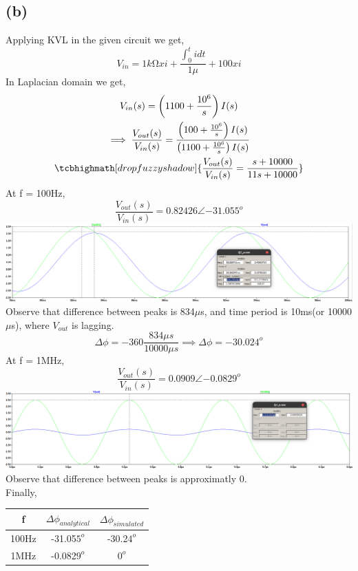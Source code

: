 \documentclass{article}
\begin{document}
\subsection*{(b)}
Applying KVL in the given circuit we get,
\begin{equation*}
V_{in} = 1k{\si{\ohm}}xi + \frac{\int_0^t{i dt}}{1\mu} + 100xi
\end{equation*}
In Laplacian domain we get,
\begin{gather*}
V_{in}(s) = \left(1100 + \frac{10^6}{s}\right)I(s)\\
\implies \frac{V_{out}(s)}{V_{in}(s)} = \frac{\left(100 + \frac{10^6}{s}\right)I(s)}{\left(1100 + \frac{10^6}{s}\right)I(s)}\\
\tcbhighmath[drop fuzzy shadow]{\frac{V_{out}(s)}{V_{in}(s)} = \frac{s + 10000}{11s + 10000}}
\end{gather*}
At f = 100Hz,\\
\begin{equation*}
\frac{V_{out}(s)}{V_{in}(s)} = 0.82426\angle{-31.055^o}
\end{equation*}
\includegraphics[scale=0.28]{./figs/Q1_b_ts.png}\\
Observe that difference between peaks is 834$\mu$s, and time period is 10ms(or 10000$\mu$s), where $V_{out}$ is lagging.
\begin{equation*}
\Delta \phi = -360\frac{834 \mu s}{10000 \mu s} \implies \Delta \phi = -30.024^o
\end{equation*}
At f = 1MHz,\\
\begin{equation*}
\frac{V_{out}(s)}{V_{in}(s)} = 0.0909\angle{-0.0829^o}
\end{equation*}
\includegraphics[scale=0.28]{./figs/Q1_b_tr_1.png}\\
Observe that difference between peaks is approximatly 0.\\
Finally,\\
\begin{center}
\begin{tabular}{|c|c|c|}
\hline
f & $\Delta {\phi}_{analytical}$ & $\Delta {\phi}_{simulated}$ \\
\hline
100Hz & -31.05$5^o$ & -30.2$4^o$  \\
\hline
1MHz & -0.082$9^o$ & $0^o$\\
\hline
\end{tabular}
\end{center}
\end{document}
